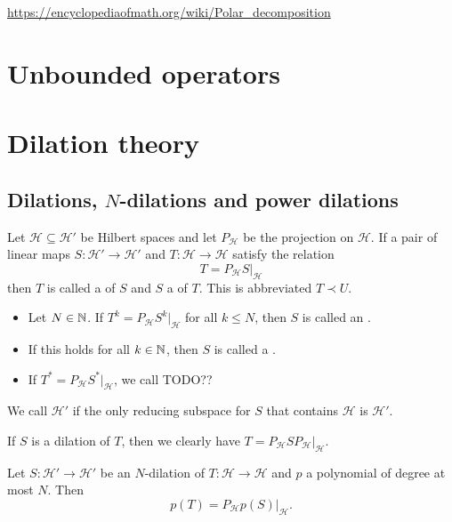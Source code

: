 \url{https://encyclopediaofmath.org/wiki/Polar_decomposition}

\section{Unbounded operators}

\section{Dilation theory}
\subsection{Dilations, $N$-dilations and power dilations}
\begin{definition}
Let $\mathcal{H} \subseteq \mathcal{H}'$ be Hilbert spaces and let $P_\mathcal{H}$ be the projection on $\mathcal{H}$. If a pair of linear maps $S: \mathcal{H}'\to\mathcal{H}'$ and $T: \mathcal{H}\to \mathcal{H}$ satisfy the relation
\[ T = P_\mathcal{H} S |_\mathcal{H} \]
then $T$ is called a  of $S$ and $S$ a  of $T$. This is abbreviated $T\prec U$.

\begin{itemize}
\item Let $N\in\mathbb{N}$. If $T^k = P_\mathcal{H} S^k |_\mathcal{H}$ for all $k\leq N$, then $S$ is called an .
\item If this holds for all $k\in\mathbb{N}$, then $S$ is called a .
\item If $T^* = P_\mathcal{H} S^* |_\mathcal{H}$, we call TODO??
\end{itemize}
We call $\mathcal{H}'$  if the only reducing subspace for $S$ that contains $\mathcal{H}$ is $\mathcal{H}'$.
\end{definition}

If $S$ is a dilation of $T$, then we clearly have $T = P_\mathcal{H} S P_\mathcal{H}|_\mathcal{H}$.

\begin{lemma}
Let $S:\mathcal{H}'\to\mathcal{H}'$ be an $N$-dilation of $T: \mathcal{H}\to \mathcal{H}$ and $p$ a polynomial of degree at most $N$. Then
\[ p(T) = P_\mathcal{H}p(S)|_\mathcal{H}. \]
\end{lemma}

